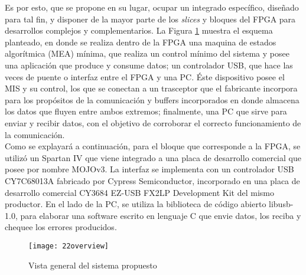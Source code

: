 Es por esto, que se propone en su lugar, ocupar un integrado específico, diseñado para tal fin, y disponer de la mayor parte de los {\it slices} y bloques del FPGA para desarrollos complejos y complementarios. La Figura \ref{overview} muestra el esquema planteado, en donde se realiza dentro de la FPGA una maquina de estados algorítmica (MEA) mínima, que realiza un control mínimo del sistema y posee una aplicación que produce y consume datos; un controlador USB, que hace las veces de puente o interfaz entre el FPGA y una PC. Éste dispositivo posee el MIS y su control, los que se conectan a un trasceptor que el fabricante incorpora para los propósitos de la comunicación y buffers incorporados en donde almacena los datos que fluyen entre ambos extremos; finalmente, una PC que sirve para enviar y recibir datos, con el objetivo de corroborar el correcto funcionamiento de la comunicación.\\

Como se explayará a continuación, para el bloque que corresponde a la FPGA, se utilizó un Spartan IV que viene integrado a una placa de desarrollo comercial que posee por nombre MOJOv3. La interfaz se implementa con un controlador USB CY7C68013A fabricado por Cypress Semiconductor, incorporado en una placa de desarrollo comercial CY3684 EZ-USB FX2LP Development Kit del mismo productor. En el lado de la PC, se utiliza la biblioteca de código abierto libusb-1.0, para elaborar una software escrito en lenguaje C que envie datos, los reciba y chequee los errores producidos.\\ 

\begin{figure}
	\centering
	\texttt{[image: 22overview]}
	\caption{Vista general del sistema propuesto}
	\label{overview}
\end{figure}